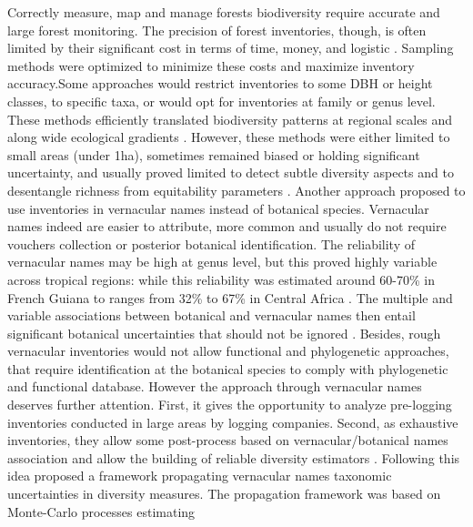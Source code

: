 \documentclass[fleqn,10pt]{ArtEcoFoG} %
\begin{document}
Correctly measure, map and manage forests biodiversity require accurate
and large forest monitoring. The precision of forest inventories,
though, is often limited by their significant cost in terms of time,
money, and logistic \citep{Feeley2011, Baraloto2013}. Sampling methods
were optimized to minimize these costs and maximize inventory
accuracy.Some approaches would restrict inventories to some DBH or
height classes, to specific taxa, or would opt for inventories at family
or genus level. These methods efficiently translated biodiversity
patterns at regional scales and along wide ecological gradients
\citep{Steege2000, Higgins2004, Rejou-Mechain2011, Pos2014}. However,
these methods were either limited to small areas (under 1ha), sometimes
remained biased or holding significant uncertainty, and usually proved
limited to detect subtle diversity aspects and to desentangle richness
from equitability parameters
\citetext{\citealp{Phillips2003a}; \citealp{Baraloto2013}; \citealp[
]{Guitet2014b}; \citealp{Vellend2008}; \citealp{Prance1994}}. Another
approach proposed to use inventories in vernacular names instead of
botanical species. Vernacular names indeed are easier to attribute, more
common and usually do not require vouchers collection or posterior
botanical identification. The reliability of vernacular names may be
high at genus level, but this proved highly variable across tropical
regions: while this reliability was estimated around 60-70\% in French
Guiana \citep{Hawes2012, Guitet2014b} to ranges from 32\% to 67\% in
Central Africa \citep{Rejou-Mechain2011}. The multiple and variable
associations between botanical and vernacular names then entail
significant botanical uncertainties that should not be ignored
\citep{Oldeman1968}. Besides, rough vernacular inventories would not
allow functional and phylogenetic approaches, that require
identification at the botanical species to comply with phylogenetic and
functional database. However the approach through vernacular names
deserves further attention. First, it gives the opportunity to analyze
pre-logging inventories conducted in large areas by logging companies.
Second, as exhaustive inventories, they allow some post-process based on
vernacular/botanical names association and allow the building of
reliable diversity estimators
\citep{TerSteege2006, Feldpausch2006, Rejou-Mechain2008, Rejou-Mechain2011}.
Following this idea \citet{Guitet2014b} proposed a framework propagating
vernacular names taxonomic uncertainties in diversity measures. The
propagation framework was based on Monte-Carlo processes estimating
\end{document}
